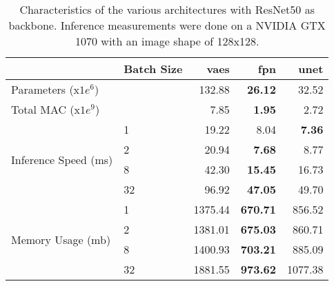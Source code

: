 \begin{table}[ht]
\centering
\caption{Characteristics of the various architectures with ResNet50 as backbone. Inference measurements were done on a NVIDIA GTX 1070 with an image shape of 128x128.}
\label{tab:model_characteristics}
\begin{tabular}{llrrr}
\toprule
 & Batch Size & vaes & fpn & unet \\
\midrule
Parameters (x$1e^6$) &   & 132.88 & \textbf{26.12} & 32.52 \\
Total MAC (x$1e^9$) &   & 7.85 & \textbf{1.95} & 2.72 \\
\multirow[c]{4}{*}{Inference Speed (ms)} & 1 & 19.22 & 8.04 & \textbf{7.36} \\
 & 2 & 20.94 & \textbf{7.68} & 8.77 \\
 & 8 & 42.30 & \textbf{15.45} & 16.73 \\
 & 32 & 96.92 & \textbf{47.05} & 49.70 \\
\multirow[c]{4}{*}{Memory Usage (mb)} & 1 & 1375.44 & \textbf{670.71} & 856.52 \\
 & 2 & 1381.01 & \textbf{675.03} & 860.71 \\
 & 8 & 1400.93 & \textbf{703.21} & 885.09 \\
 & 32 & 1881.55 & \textbf{973.62} & 1077.38 \\
\bottomrule
\end{tabular}
\end{table}
